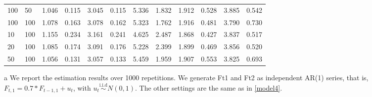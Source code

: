 \documentclass[a4paper]{article}
\begin{document}
\begin{table}[]
\begin{threeparttable}
\begin{tabular}{llllllllllll}
100 & 50  & 1.046                                                             & 0.115 & 3.045                                                             & 0.115 & 5.336                                                         & 1.832 & 1.912                                                            & 0.528 & 3.885                                                            & 0.542 \\
100 & 100 & 1.078                                                             & 0.163 & 3.078                                                             & 0.162 & 5.323                                                         & 1.762 & 1.916                                                            & 0.481 & 3.790                                                            & 0.730 \\
10  & 100 & 1.155                                                             & 0.234 & 3.161                                                             & 0.241 & 4.625                                                         & 2.487 & 1.868                                                            & 0.427 & 3.837                                                            & 0.517 \\
20  & 100 & 1.085                                                             & 0.174 & 3.091                                                             & 0.176 & 5.228                                                         & 2.399 & 1.899                                                            & 0.469 & 3.856                                                            & 0.520 \\
50  & 100 & 1.056                                                             & 0.131 & 3.057                                                             & 0.133 & 5.459                                                         & 1.959 & 1.907                                                            & 0.553 & 3.825                                                            & 0.693 \\ \hline
\end{tabular}

\begin{tablenotes}
        \footnotesize
        \item[a]  We report the estimation results over 1000 repetitions. We generate Ft1 and Ft2 as independent AR(1) series, that is, $F_{t,1}=0.7*F_{t-1,1}+ u_t$, with $u_t\stackrel{\text{i.i.d}}{\sim} N(0,1)$.
        The other settings are the same as in  \eqref{model4}.
      \end{tablenotes}
\end{threeparttable}

\end{table}
\end{document}

